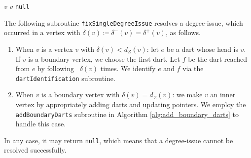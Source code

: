 \documentclass[main.tex]{subfiles}
\begin{document}
\begin{algorithm}[H]
    \caption{\vertexSingleDegreeIssueWithLink($Z, \delta^-, \delta^+)$}
    \label{alg:vertex_single_degree_issue}
    \begin{algorithmic}[1]
                \Continue
            \EndIf
                \State \Return $v$
                \State \Return $v$
            \EndIf
        \EndFor
        \State \Return \texttt{null}
    \end{algorithmic}
\end{algorithm}

The following subroutine \texttt{fixSingleDegreeIssue} resolves a degree-issue, which occurred in a vertex with $\delta(v) \coloneq \delta^-(v)=\delta^+(v)$, as follows.
\begin{enumerate}
    \item When $v$ is a vertex $v$ with $\delta(v) < d_Z(v)$: let $e$ be a dart whose head is $v$. If $v$ is a boundary vertex, we choose the first dart. Let $f$ be the dart reached from $e$ by following \successor\ $\delta(v)$ times. We identify $e$ and $f$ via the \texttt{dartIdentification} subroutine.
    \item When $v$ is a boundary vertex with $\delta(v) = d_Z(v)$: we make $v$ an inner vertex by appropriately adding darts and updating pointers. We employ the \texttt{addBoundaryDarts} subroutine in Algorithm \ref{alg:add_boundary_darts} to handle this case. 
\end{enumerate}
In any case, it may return \texttt{null}, which means that a degree-issue cannot be resolved successfully.
\end{document}
